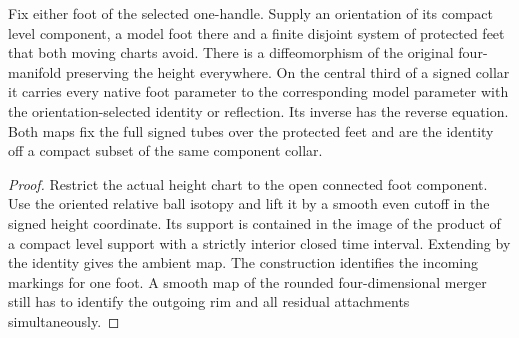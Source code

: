 \begin{theorem}
\label{thm:ed03-ambient-native-foot}
\leanok
Fix either foot of the selected one-handle. Supply an orientation of its
compact level component, a model foot there and a finite disjoint system of
protected feet that both moving charts avoid. There is a diffeomorphism
of the original four-manifold preserving the height everywhere. On the
central third of a signed collar it carries every native foot parameter to
the corresponding model parameter with the orientation-selected identity
or reflection. Its inverse has the reverse equation. Both maps fix the
full signed tubes over the protected feet and are the identity off a compact
subset of the same component collar.
\end{theorem}
\begin{proof}
\leanok
Restrict the actual height chart to the open connected foot component.
Use the oriented relative ball isotopy and lift it by a smooth even
cutoff in the signed height coordinate. Its support is contained in the
image of the product of a compact level support with a strictly interior
closed time interval. Extending by the identity gives the ambient map.
The construction identifies the incoming markings for one foot. A
smooth map of the rounded four-dimensional merger still has to identify
the outgoing rim and all residual attachments simultaneously.
\end{proof}

